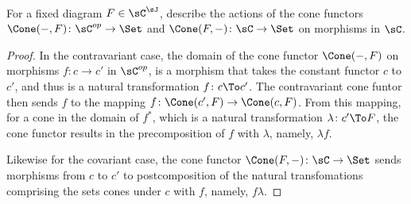 \documentclass[main.tex]{subfiles}
\begin{document}
\paragraph{}
\begin{exercise}
For a fixed diagram $F \in \sC^\sJ$, describe the actions of the cone functors $
\Cone(-,F)\colon \sC^{op} \rightarrow \Set$ and $ \Cone(F,-)\colon \sC
\rightarrow \Set$ on morphisms in $\sC$.
\end{exercise}

\begin{proof}
In the contravariant case, the domain of the cone functor $ \Cone(-,F)$
on morphisms $f\colon c \rightarrow c'$ in $\sC^{op}$, is a morphism that takes the
constant functor $c$ to $c'$, and thus is a natural transformation $f\colon c
\To c'$. The contravariant cone funtor then sends $f$ to the mapping
$f\colon \Cone(c',F)\rightarrow \Cone(c,F)$. From this mapping, for a cone
in the domain of $f^*$, which is a natural transformation $\lambda\colon c' \To
F$, the cone functor results in the precomposition of $f$ with $\lambda$,
namely, $\lambda f$.

Likewise for the covariant case, the cone functor $ \Cone(F,-)\colon \sC
\rightarrow \Set$ sends morphisms from $c$ to $c'$ to postcomposition of
the natural transfomations comprising the sets cones under $c$ with $f$,
namely, $f\lambda$.

\end{proof}
\end{document}
